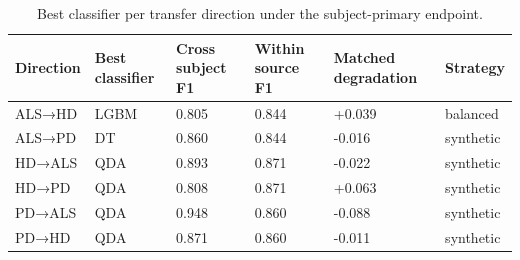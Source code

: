 \begin{table}
\caption{Best classifier per transfer direction under the subject-primary endpoint.}
\label{tab:step7-cross-transfer}
\begin{tabular}{llllll}
\toprule
Direction & Best classifier & Cross subject F1 & Within source F1 & Matched degradation & Strategy \\
\midrule
ALS→HD & LGBM & 0.805 & 0.844 & +0.039 & balanced \\
ALS→PD & DT & 0.860 & 0.844 & -0.016 & synthetic \\
HD→ALS & QDA & 0.893 & 0.871 & -0.022 & synthetic \\
HD→PD & QDA & 0.808 & 0.871 & +0.063 & synthetic \\
PD→ALS & QDA & 0.948 & 0.860 & -0.088 & synthetic \\
PD→HD & QDA & 0.871 & 0.860 & -0.011 & synthetic \\
\bottomrule
\end{tabular}
\end{table}
